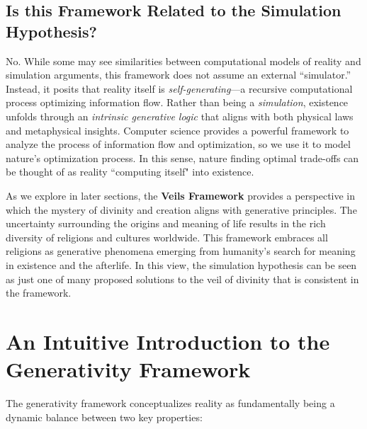 \documentclass[12pt]{article}
\begin{document}
\subsection{Is this Framework Related to the Simulation Hypothesis?}
No. While some may see similarities between computational models of reality and simulation arguments, this framework does not assume an external “simulator.” Instead, it posits that reality itself is \textit{self-generating}—a recursive computational process optimizing information flow. Rather than being a \textit{simulation}, existence unfolds through an \textit{intrinsic generative logic} that aligns with both physical laws and metaphysical insights. Computer science provides a powerful framework to analyze the process of information flow and optimization, so we use it to model nature's optimization process. In this sense, nature finding optimal trade-offs can be thought of as reality ``computing itself" into existence.

As we explore in later sections, the \textbf{Veils Framework} provides a perspective in which the mystery of divinity and creation aligns with generative principles. The uncertainty surrounding the origins and meaning of life results in the rich diversity of religions and cultures worldwide. This framework embraces all religions as generative phenomena emerging from humanity's search for meaning in existence and the afterlife. In this view, the simulation hypothesis can be seen as just one of many proposed solutions to the veil of divinity that is consistent in the framework.


\section{An Intuitive Introduction to the Generativity Framework}
The generativity framework conceptualizes reality as fundamentally being a dynamic balance between two key properties:
\end{document}
